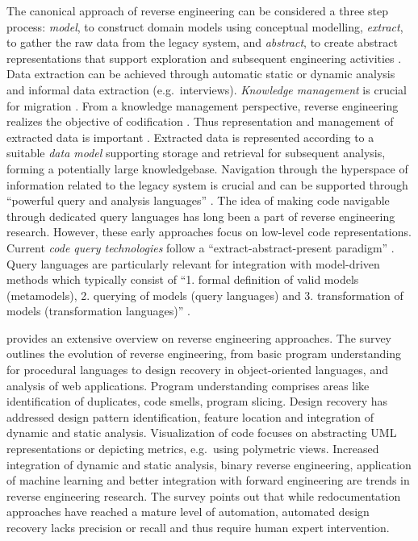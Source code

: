 The canonical approach of reverse engineering can be considered a three step process: \emph{model}, to construct domain models using conceptual modelling, \emph{extract}, to gather the raw data from the legacy system, and \emph{abstract}, to create abstract representations that support exploration and subsequent engineering activities \autocite{Tilley1996ProgramUnderstanding}.
Data extraction can be achieved through automatic static or dynamic \autocite{Stroulia2002DynamicAnalysis} analysis and informal data extraction (e.g.~interviews).
\emph{Knowledge management} is crucial for migration \autocite{Razavian2013PHD}.
From a knowledge management perspective, reverse engineering realizes the objective of codification \autocite{Hansen1999KnowledgeManagement}.
Thus representation and management of extracted data is important \autocite{Razavian2013PHD}.
Extracted data is represented according to a suitable \emph{data model} supporting storage and retrieval for subsequent analysis, forming a potentially large knowledgebase.
Navigation through the hyperspace of information related to the legacy system is crucial and can be supported through ``powerful query and analysis languages'' \autocite{Tilley1996ProgramUnderstanding}.
The idea of making code navigable through dedicated query languages \autocite{Paul1996CodeQuery,Mendelzon1995} has long been a part of reverse engineering research.
However, these early approaches focus on low-level code representations.
Current \emph{code query technologies} follow a ``extract-abstract-present paradigm'' \autocite{Khadka2011ServiciFi}.
Query languages are particularly relevant for integration with model-driven methods which typically consist of ``1.
formal definition of valid models (metamodels), 2.
querying of models (query languages) and 3.
transformation of models (transformation languages)'' \autocite{Fuhr2013SOAMIG}.

\autocite{Canfora2007ReverseEngineering} provides an extensive overview on reverse engineering approaches.
The survey outlines the evolution of reverse engineering, from basic program understanding for procedural languages to design recovery in object-oriented languages, and analysis of web applications.
Program understanding comprises areas like identification of duplicates, code smells, program slicing.
Design recovery has addressed design pattern identification, feature location and integration of dynamic and static analysis.
Visualization of code focuses on abstracting UML representations or depicting metrics, e.g.~using polymetric views.
Increased integration of dynamic and static analysis, binary reverse engineering, application of machine learning and better integration with forward engineering are trends in reverse engineering research.
The survey points out that while redocumentation approaches have reached a mature level of automation, automated design recovery lacks precision or recall and thus require human expert intervention.

